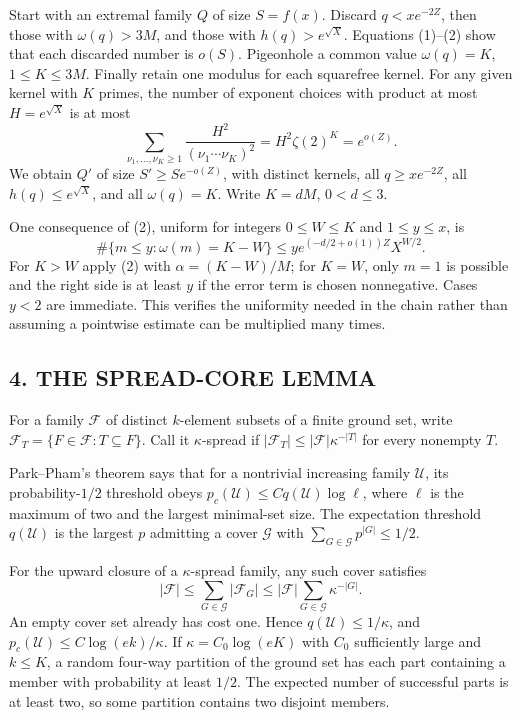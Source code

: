 Start with an extremal family $Q$ of size $S=f(x)$. Discard $q<xe^{-2Z}$, then those with $\omega(q)>3M$, and those with $h(q)>e^{\sqrt X}$. Equations (1)--(2) show that each discarded number is $o(S)$. Pigeonhole a common value $\omega(q)=K$, $1\le K\le3M$. Finally retain one modulus for each squarefree kernel. For any given kernel with $K$ primes, the number of exponent choices with product at most $H=e^{\sqrt X}$ is at most
\[
 \sum_{\nu_1,\ldots,\nu_K\ge1}
       \frac{H^2}{(\nu_1\cdots\nu_K)^2}
 =H^2\zeta(2)^K=e^{o(Z)}.
\]
We obtain $Q'$ of size $S'\ge S e^{-o(Z)}$, with distinct kernels, all $q\ge xe^{-2Z}$, all $h(q)\le e^{\sqrt X}$, and all $\omega(q)=K$. Write $K=dM$, $0<d\le3$.

One consequence of (2), uniform for integers $0\le W\le K$ and $1\le y\le x$, is
\[
 \#\{m\le y:\omega(m)=K-W\}
 \le y e^{(-d/2+o(1))Z}X^{W/2}.                      \tag{3}
\]
For $K>W$ apply (2) with $\alpha=(K-W)/M$; for $K=W$, only $m=1$ is possible and the right side is at least $y$ if the error term is chosen nonnegative. Cases $y<2$ are immediate. This verifies the uniformity needed in the chain rather than assuming a pointwise estimate can be multiplied many times.
\subsection*{4. THE SPREAD-CORE LEMMA}
For a family $\mathcal F$ of distinct $k$-element subsets of a finite ground set, write $\mathcal F_T=\{F\in\mathcal F:T\subseteq F\}$. Call it $\kappa$-spread if $|\mathcal F_T|\le|\mathcal F|\kappa^{-|T|}$ for every nonempty $T$.

Park--Pham's theorem says that for a nontrivial increasing family $\mathcal U$, its probability-$1/2$ threshold obeys $p_c(\mathcal U)\le C q(\mathcal U)\log\ell$, where $\ell$ is the maximum of two and the largest minimal-set size. The expectation threshold $q(\mathcal U)$ is the largest $p$ admitting a cover $\mathcal G$ with $\sum_{G\in\mathcal G}p^{|G|}\le1/2$.

For the upward closure of a $\kappa$-spread family, any such cover satisfies
\[
 |\mathcal F|\le\sum_{G\in\mathcal G}|\mathcal F_G|
 \le|\mathcal F|\sum_{G\in\mathcal G}\kappa^{-|G|}.
\]
An empty cover set already has cost one. Hence $q(\mathcal U)\le1/\kappa$, and $p_c(\mathcal U)\le C\log(ek)/\kappa$.
If $\kappa=C_0\log(eK)$ with $C_0$ sufficiently large and $k\le K$, a random four-way partition of the ground set has each part containing a member with probability at least $1/2$. The expected number of successful parts is at least two, so some partition contains two disjoint members.

